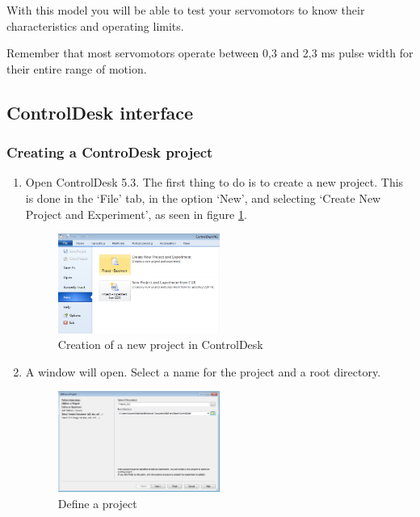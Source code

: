 With this model you will be able to test your servomotors to know their characteristics and operating limits.\par
Remember that most servomotors operate between 0,3 and 2,3 ms pulse width for their entire range of motion.

\subsection{ControlDesk interface}

\subsubsection{Creating a ControDesk project}
\begin{enumerate}
    \item Open ControlDesk 5.3. The first thing to do is to create a new project. This is done in the ‘File’ tab, in the option ‘New’, and selecting ‘Create New Project and Experiment’, as seen in figure \ref{fig24}.
    \begin{figure}[H]
        \centering
        \includegraphics[width=0.5\textwidth]{Images/Ball and Bean/ControlDesk/CD1.png}
        \caption{Creation of a new project in ControlDesk}
        \label{fig24}
    \end{figure}
    \item A window will open. Select a name for the project and a root directory.
    \begin{figure}[H]
        \centering
        \includegraphics[width=0.5\textwidth]{Images/Ball and Bean/ControlDesk/CD2.png}
        \caption{Define a project}
        \label{fig25}
    \end{figure}

\end{enumerate}
